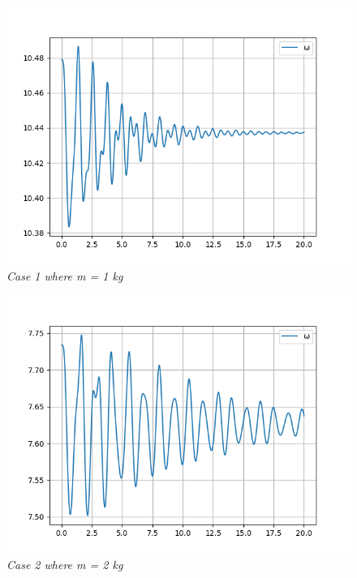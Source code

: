         \begin{figure}[H]
            \centering
            \includegraphics{Appendix/RSimPictures/AF/afm1.png}
            \caption{\textit{Case 1 where m = 1 kg}}
            \label{}
        \end{figure}
            
        \begin{figure}[H]
            \centering
            \includegraphics{Appendix/RSimPictures/AF/afm2.png}
            \caption{\textit{Case 2 where m = 2 kg}}
            \label{}
        \end{figure}
            

